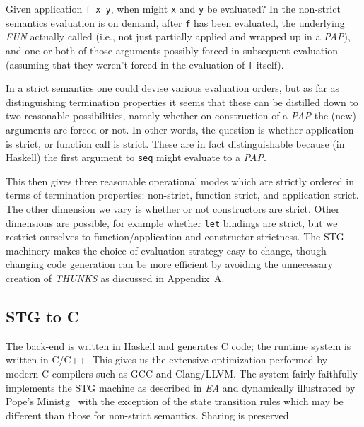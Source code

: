 \documentclass{llncs}
\begin{document}
Given application \texttt{f x y}, when might \texttt{x} and \texttt{y} be
evaluated?  In the non-strict semantics evaluation is on demand, after
\texttt{f} has been evaluated, the underlying \emph{FUN} actually called
(i.e., not just partially applied and wrapped up in a \emph{PAP}), and one or
both of those arguments possibly forced in subsequent evaluation (assuming
that they weren't forced in the evaluation of \texttt{f} itself).

In a strict semantics one could devise various evaluation orders, but as far
as distinguishing termination properties it seems that these can be distilled
down to two reasonable possibilities, namely whether on construction of a
\emph{PAP} the (new) arguments are forced or not.  In other words, the
question is whether application is strict, or function call is strict.  These
are in fact distinguishable because (in Haskell) the first argument to
\texttt{seq} might evaluate to a \emph{PAP}.

This then gives three reasonable operational modes which are strictly ordered
in terms of termination properties: 
non-strict, function strict, and application strict.
The other dimension we vary is whether or not constructors are strict.  Other
dimensions are possible, for example whether \texttt{let} bindings are strict,
but we restrict ourselves to function/application and constructor strictness.
The STG machinery makes the choice of evaluation strategy easy to change,
though changing code generation can be more efficient by avoiding the
unnecessary creation of \emph{THUNKS} as discussed in Appendix~A.


\subsection{STG to C}
The back-end is written in Haskell and generates C code; the runtime system is
written in C/C++. This gives us the extensive optimization performed by modern
C compilers such as GCC and Clang/LLVM. The system fairly faithfully
implements the STG machine as described in \emph{EA} and dynamically
illustrated by Pope's Ministg~\cite{ministg} with the exception of the state
transition rules which may be different than those for non-strict semantics.
Sharing is preserved.
\end{document}
